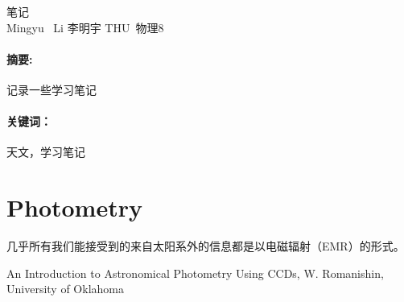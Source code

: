 \documentclass[CJK, utf8, GBK, oneside, a4paper, 12pt]{ctexart}
\newcommand{\myfiguresetwidthfilecaplabel}[4]{
    \centering
    \texttt{[image: ./images/\#2]}
    \captionsetup{font={footnotesize}}
    \caption{#3}
    \label{#4} }
\renewenvironment*{abstract}[1]{%
\newcommand\gjc{#1}
\paragraph{摘要:}
}{\paragraph{关键词：}\gjc }
\newcommand{\rd}{\mathrm{d}}
\newcommand{\dps}[1]{\displaystyle{#1}}
\begin{document}



\renewcommand\appendix{\setcounter{secnumdepth}{-2}}



\begin{center}
    \heiti{}笔记\\
    \kaishu{}Mingyu \ Li \qquad 李明宇 \qquad THU\  物理8
\end{center}

\begin{abstract}{天文，学习笔记}
    记录一些学习笔记
\end{abstract}
\tableofcontents
\newpage
\begin{comment}
\begin{equation}\dps{ v_g=\frac{\rd \omega}{\rd k}=\frac{c}{n+\omega\frac{\rd n}{\rd \omega}}}\end{equation}

\begin{figure}[!htbp]
    \myfiguresetwidthfilecaplabel{0.92}{1}{周期性阻抗同轴电缆示意图}{F1}
\end{figure}

\end{comment}
\section{Photometry}

几乎所有我们能接受到的来自太阳系外的信息都是以电磁辐射（EMR）的形式。






\begin{thebibliography}{1}
 An Introduction to Astronomical Photometry Using CCDs, W. Romanishin, University of Oklahoma
\end{thebibliography}
\end{document}
